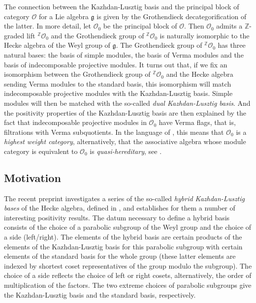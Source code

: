 \documentclass[a4paper]{amsart}
\begin{document}
The connection between the Kazhdan-Lusztig basis
and the principal block of 
category $\mathcal{O}$ for a Lie algebra $\mathfrak{g}$
is given by the Grothendieck decategorification of the latter.
In more detail, let $\mathcal{O}_0$ be the principal block of 
$\mathcal{O}$. Then $\mathcal{O}_0$ admits a 
$\mathbb{Z}$-graded lift ${}^{\mathbb{Z}}\mathcal{O}_0$ and 
the Grothendieck group of ${}^{\mathbb{Z}}\mathcal{O}_0$ is
naturally isomorphic to the Hecke algebra of the Weyl group of
$\mathfrak{g}$. The Grothendieck group of ${}^{\mathbb{Z}}\mathcal{O}_0$
has three natural bases: the basis of simple modules, the basis of 
Verma modules and the basis of indecomposable projective modules.
It turns out that, if we fix an isomorphism between the 
Grothendieck group of ${}^{\mathbb{Z}}\mathcal{O}_0$ 
and the Hecke algebra sending Verma modules
to the standard basis, this isomorphism will match indecomposable
projective modules with the Kazhdan-Lusztig basis. Simple modules
will then be matched with the so-called {\em dual Kazhdan-Lusztig basis}.
And the positivity properties of the Kazhdan-Lusztig basis are then
explained by the fact that indecomposable projective modules in 
$\mathcal{O}_0$ have Verma flags, that is, filtrations with Verma
subquotients. In the language of \cite{CPS0}, this means that 
$\mathcal{O}_0$ is a {\em highest weight category}, alternatively, that
the associative algebra whose module category is equivalent to 
$\mathcal{O}_0$ is {\em quasi-hereditary}, see \cite{DR}.

\subsection{Motivation}\label{s0.2}

The recent preprint \cite{BMS} investigates a series of the so-called
{\em hybrid Kazhdan-Lusztig bases} of the Hecke algebra, defined in
\cite{GH07}, and establishes for them a number of interesting 
positivity results. The datum necessary to define a hybrid basis
consists of the choice of a parabolic subgroup of the Weyl group and
the choice of a side (left/right). The elements of the hybrid basis 
are certain products of the elements of the Kazhdan-Lusztig basis for
this parabolic subgroup with certain elements of the standard basis
for the whole group (these latter elements are indexed by  shortest 
coset representatives of the group modulo the subgroup).
The choice of a side reflects 
the choice of left or right cosets, alternatively, the order of 
multiplication of the factors. The two extreme choices of parabolic 
subgroups give the Kazhdan-Lusztig basis and the standard basis, 
respectively.
\end{document}
